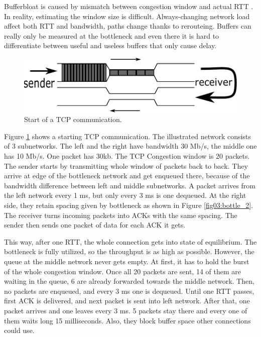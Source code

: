 

Bufferbloat is caused by mismatch between congestion window and actual RTT \cite{CoDel}. In reality, estimating the window size is difficult. Always-changing network load affect both RTT and bandwidth, paths change thanks to rerouteing. Buffers can really only be measured at the bottleneck and even there it is hard to differentiate between useful and useless buffers that only cause delay.

\begin{figure}
	\centering
	\includegraphics[width=137mm]{drawings/tcp_bottleneck_1}
	\caption{Start of a TCP communication.}
	
	\label{fig02:bottle_1}
\end{figure}


Figure \ref{fig02:bottle_1} shows a starting TCP communication. The illustrated network consists of 3 subnetworks. The left and the right have bandwidth 30 Mb/s, the middle one has 10 Mb/s. One packet has 30kb. The TCP Congestion window is 20 packets. The sender starts by transmitting whole window of packets back to back. They arrive at edge of the bottleneck network and get enqueued there, because of the bandwidth difference between left and middle subnetworks. A packet arrives from the left network every 1 ms, but only every 3 ms is one dequeued. At the right side, they retain spacing given by bottleneck as shown in Figure \ref{fig03:bottle_2}. The receiver turns incoming packets into ACKs with the same spacing. The sender then sends one packet of data for each ACK it gets.

This way, after one RTT, the whole connection gets into state of equilibrium. The bottleneck is fully utilized, so the throughput is as high as possible. However, the queue at the middle network never gets empty. At first, it has to hold the burst of the whole congestion window. Once all 20 packets are sent, 14 of them are waiting in the queue, 6 are already forwarded towards the middle network. Then, no packets are enqueued, and every 3 ms one is dequeued. Until one RTT passes, first ACK is delivered, and next packet is sent into left network. After that, one packet arrives and one leaves every 3 ms. 5 packets stay there and every one of them waits long 15 milliseconds. Also, they block buffer space other connections could use. 

